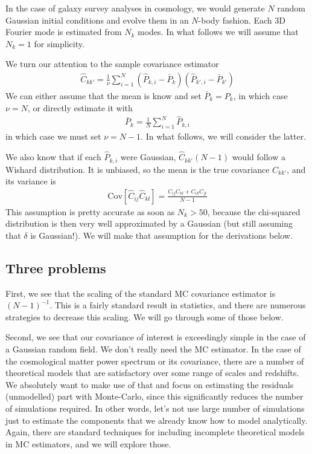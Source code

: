 \documentclass{aastex6}
\newcommand{\eqn}[1]{\begin{eqnarray}#1\end{eqnarray}}
\begin{document}
In the case of galaxy survey analyses in cosmology, we would generate $N$ random Gaussian initial conditions and evolve them in an $N$-body fashion. Each 3D Fourier mode is estimated from $N_k$ modes. In what follows we will assume that $N_k=1$ for simplicity.

We turn our attention to the sample covariance estimator
\eqn{
	\hat{C}_{kk'} = \frac{1}{\nu}  \sum_{i=1}^{N} (\hat{P}_{k, i} - \bar{P}_{k})(\hat{P}_{k', i} - \bar{P}_{k'})
}
We can either assume that the mean is know and set $\bar{P}_{k}=P_k$, in which case $\nu=N$, or directly estimate it with
\eqn{
	\bar{P}_{k} = \frac{1}{N}  \sum_{i=1}^{N} \hat{P}_{k, i}
}
in which case we must set $\nu=N-1$. In what follows, we will consider the latter. 

We also know that if each $\hat{P}_{k, i}$ were Gaussian, $\hat{C}_{kk'} (N-1)$ would follow a Wishard distribution. It is unbiased, so the mean is the true covariance $C_{kk'}$, and its variance is
\eqn{
	\mathrm{Cov}[\hat{C}_{ij} \hat{C}_{kl}] = \frac{C_{ij}C_{kl} + C_{ik}C_{jl}}{N-1}
}
This assumption is pretty accurate as soon as $N_k>50$, because the chi-squared distribution is then very well approximated by a Gaussian (but still assuming that $\delta$ is Gaussian!). 
We will make that assumption for the derivations below.


\subsection{Three problems}

First, we see that the scaling of the standard MC covariance estimator is $(N-1)^{-1}$.
This is a fairly standard result in statistics, and there are numerous strategies to decrease this scaling. 
We will go through some of those below.

Second, we see that our covariance of interest is exceedingly simple in the case of a Gaussian random field. We don't really need the MC estimator. 
In the case of the cosmological matter power spectrum or its covariance, there are a number of theoretical models that are satisfactory over some range of scales and redshifts. 
We absolutely want to make use of that and focus on estimating the residuals (unmodelled) part with Monte-Carlo, since this significantly reduces the number of simulations required. 
In other words, let's not use large number of simulations just to estimate the components that we already know how to model analytically.
Again, there are standard techniques for including incomplete theoretical models in MC estimators, and we will explore those.
\end{document}
